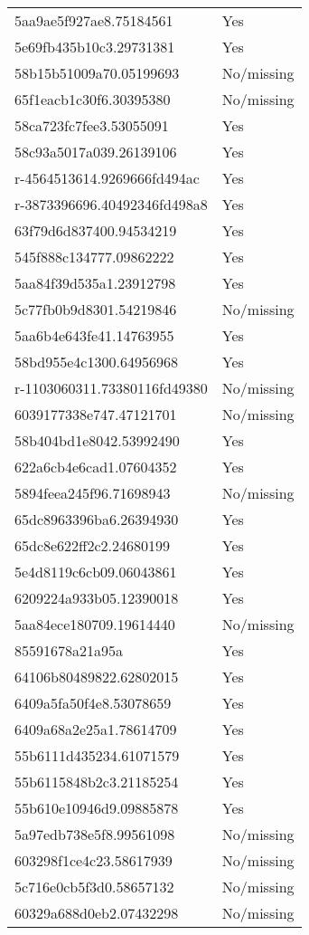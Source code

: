 \begin{tabular}{ll}
5aa9ae5f927ae8.75184561 & Yes \\
5e69fb435b10c3.29731381 & Yes \\
58b15b51009a70.05199693 & No/missing \\
65f1eacb1c30f6.30395380 & No/missing \\
58ca723fc7fee3.53055091 & Yes \\
58c93a5017a039.26139106 & Yes \\
r-4564513614.9269666fd494ac & Yes \\
r-3873396696.40492346fd498a8 & Yes \\
63f79d6d837400.94534219 & Yes \\
545f888c134777.09862222 & Yes \\
5aa84f39d535a1.23912798 & Yes \\
5c77fb0b9d8301.54219846 & No/missing \\
5aa6b4e643fe41.14763955 & Yes \\
58bd955e4c1300.64956968 & Yes \\
r-1103060311.73380116fd49380 & No/missing \\
6039177338e747.47121701 & No/missing \\
58b404bd1e8042.53992490 & Yes \\
622a6cb4e6cad1.07604352 & Yes \\
5894feea245f96.71698943 & No/missing \\
65dc8963396ba6.26394930 & Yes \\
65dc8e622ff2c2.24680199 & Yes \\
5e4d8119c6cb09.06043861 & Yes \\
6209224a933b05.12390018 & Yes \\
5aa84ece180709.19614440 & No/missing \\
85591678a21a95a & Yes \\
64106b80489822.62802015 & Yes \\
6409a5fa50f4e8.53078659 & Yes \\
6409a68a2e25a1.78614709 & Yes \\
55b6111d435234.61071579 & Yes \\
55b6115848b2c3.21185254 & Yes \\
55b610e10946d9.09885878 & Yes \\
5a97edb738e5f8.99561098 & No/missing \\
603298f1ce4c23.58617939 & No/missing \\
5c716e0cb5f3d0.58657132 & No/missing \\
60329a688d0eb2.07432298 & No/missing \\

\end{tabular}
